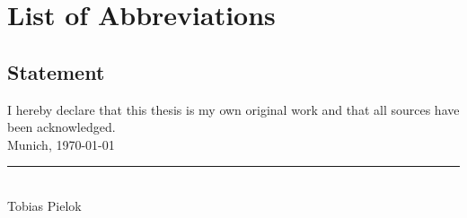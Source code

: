 \documentclass[12pt,letterpaper]{article}
\numberwithin{equation}{subsection}
\begin{document}
\pagestyle{fancy}

 

\nocite{*} 
\clearpage

\listoffigures
{}
\clearpage


\section*{List of Abbreviations}
\begin{multicols}{2}
  \begin{acronym}[abr]
  \end{acronym}
\end{multicols}



\pagebreak
\subsection*{Statement}
\label{erklaerung}
\vspace*{0.5cm}
I hereby declare that this thesis is my own original work and that all sources have been acknowledged.\\[1.0cm]
Munich, \today \\[2.0cm]
\rule{6.0cm}{0.4pt} \\
Tobias Pielok
\end{document}
